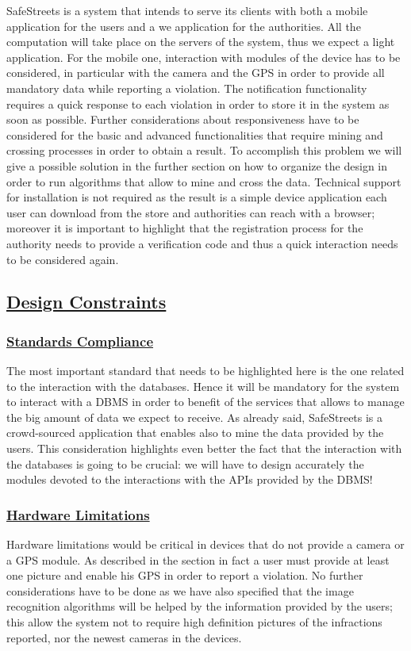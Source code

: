 		SafeStreets is a system that intends to serve its clients with both a mobile application for the users and a we application for the authorities. All the computation will take place on the servers of the system, thus we expect a light application. For the mobile one, interaction with modules of the device has to be considered, in particular with the camera and the GPS in order to provide all mandatory data while reporting a violation. The notification functionality requires a quick response to each violation in order to store it in the system as soon as possible. Further considerations about responsiveness have to be considered for the basic and advanced functionalities that require mining and crossing processes in order to obtain a result. To accomplish this problem we will give a possible solution in the further section on how to organize the design in order to run algorithms that allow to mine and cross the data. Technical support for installation is not required as the result is a simple device application each user can download from the store and authorities can reach with a browser; moreover it is important to highlight that the registration process for the authority needs to provide a verification code and thus a quick interaction needs to be considered again.
	
	\subsection[Design Constraints]{\hyperlink{toc}{Design Constraints}}
		\subsubsection[Standards Compliance]{\hyperlink{toc}{Standards Compliance}}
			\label{sec:standardCompliance}
			The most important standard that needs to be highlighted here is the one related to the interaction with the databases. Hence it will be mandatory for the system to interact with a DBMS in order to benefit of the services that allows to manage the big amount of data we expect to receive. As already said, SafeStreets is a crowd-sourced application that enables also to mine the data provided by the users. This consideration highlights even better the fact that the interaction with the databases is going to be crucial: we will have to design accurately the modules devoted to the interactions with the APIs provided by the DBMS!
		\subsubsection[Hardware Limitations]{\hyperlink{toc}{Hardware Limitations}}
			Hardware limitations would be critical in devices that do not provide a camera or a GPS module. As described in the section  in fact a user must provide at least one picture and enable his GPS in order to report a violation. No further considerations have to be done as we have also specified that the image recognition algorithms will be helped by the information provided by the users; this allow the system not to require high definition pictures of the infractions reported, nor the newest cameras in the devices.
